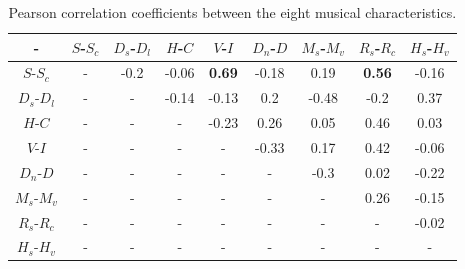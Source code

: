 \documentclass[
 aip,
 jmp,
 amsmath,amssymb,
 reprint,
]{revtex4-1}
\begin{document}
\begin{table}[ht]
\caption{\label{tab:tableBmus}Pearson correlation coefficients between
  the eight musical characteristics.}
\begin{ruledtabular}
\begin{tabular}{|c||c|c|c|c|c|c|c|c|}
-    & \tiny  $S$-$S_c$ & \tiny  $D_s$-$D_l$ & \tiny  $H$-$C$ & \tiny  $V$-$I$ & \tiny  $D_n$-$D$ & \tiny  $M_s$-$M_v$ & \tiny  $R_s$-$R_c$ & \tiny  $H_s$-$H_v$  \\ \hline
\tiny$S$-$S_c$ & -     &  -0.2 &  -0.06 &  \textbf{0.69}  & -0.18 &  0.19   &  \textbf{0.56} &  -0.16 \\
\tiny$D_s$-$D_l$ & -     &  -     &  -0.14 &  -0.13          &  0.2  &  -0.48  &  -0.2         &  0.37 \\
\tiny$H$-$C$ & -     &  -     &  -     &  -0.23          &  0.26  &  0.05  &  0.46          &  0.03 \\
\tiny$V$-$I$ & -     &  -     &  -     &  -              & -0.33 &  0.17   &  0.42          &  -0.06 \\
\tiny$D_n$-$D$ & -     &  -     &  -     &  -              &  -    &  -0.3  &  0.02          &  -0.22 \\
\tiny$M_s$-$M_v$ & -     &  -     &  -     &  -              &  -    &  -      &  0.26          &  -0.15 \\
\tiny$R_s$-$R_c$ & -     &  -     &  -     &  -              &  -    &  -      &  -             &  -0.02 \\
\tiny$H_s$-$H_v$ & -     &  -     &  -     &  -              &  -    &  -      &  -             &  - \\
\end{tabular}
\end{ruledtabular}
\end{table}
\end{document}

